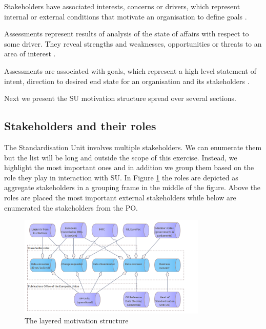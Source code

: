 	Stakeholders have associated interests, concerns or drivers, which represent internal or external conditions that motivate an organisation to define goals \citep{archimate3.1}.
	
	
	 
	Assessments represent results of analysis of the state of affairs with respect to some driver. They reveal strengths and weaknesses, opportunities or threats to an area of interest \citep{archimate3.1}.
	
	Assessments are associated with goals, which represent a high level statement of intent, direction to desired end state for an organisation and its stakeholders \citep{archimate3.1}. 
	
	Next we present the SU motivation structure spread over several sections.
	
	\subsection{Stakeholders and their roles}
	
	The Standardisation Unit involves multiple stakeholders. We can enumerate them but the list will be long and outside the scope of this exercise. Instead, we highlight the most important ones and in addition we group them based on the role they play in interaction with SU. In Figure \ref{fig:stakehodlers-roles} the roles are depicted as aggregate stakeholders in a grouping frame in the middle of the figure. Above the roles are placed the most important external stakeholders while below are enumerated the stakeholders from the PO.
	
	\begin{figure}[hbt!]
		\centering
		\includegraphics[width=0.8\textwidth]{images/motivation/Stakeholders & Roles.png}
		\caption{The layered motivation structure}
		\label{fig:stakehodlers-roles}
	\end{figure}
	

